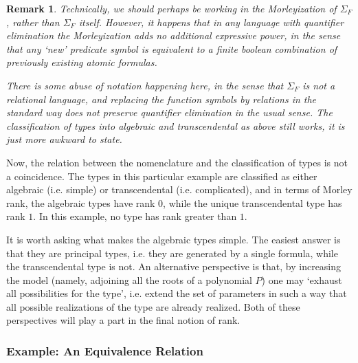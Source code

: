 \documentclass{article}
\newtheorem{remark}[theorem]{Remark}
\theoremstyle{nonumberplain}
\begin{document}
\begin{remark}\label{rmk:qem}
Technically, we should perhaps be working in the Morleyization of $\Sigma_F$, rather than $\Sigma_F$ itself. However, it happens that in any language with quantifier elimination the Morleyization adds no additional expressive power, in the sense that any `new' predicate symbol is equivalent to a finite boolean combination of previously existing atomic formulas.

There is some abuse of notation happening here, in the sense that $\Sigma_F$ is not a relational language, and replacing the function symbols by relations in the standard way does not preserve quantifier elimination in the usual sense. The classification of types into algebraic and transcendental as above still works, it is just more awkward to state.
\end{remark}

Now, the relation between the nomenclature and the classification of types is not a coincidence. The types in this particular example are classified as either algebraic (i.e. simple) or transcendental (i.e. complicated), and in terms of Morley rank, the algebraic types have rank $0$, while the unique transcendental type has rank $1$. In this example, no type has rank greater than $1$.

It is worth asking what makes the algebraic types simple. The easiest answer is that they are principal types, i.e. they are generated by a single formula, while the transcendental type is not. An alternative perspective is that, by increasing the model (namely, adjoining all the roots of a polynomial $P$) one may `exhaust all possibilities for the type', i.e. extend the set of parameters in such a way that all possible realizations of the type are already realized. Both of these perspectives will play a part in the final notion of rank.

\subsubsection{Example: An Equivalence Relation}
\end{document}
